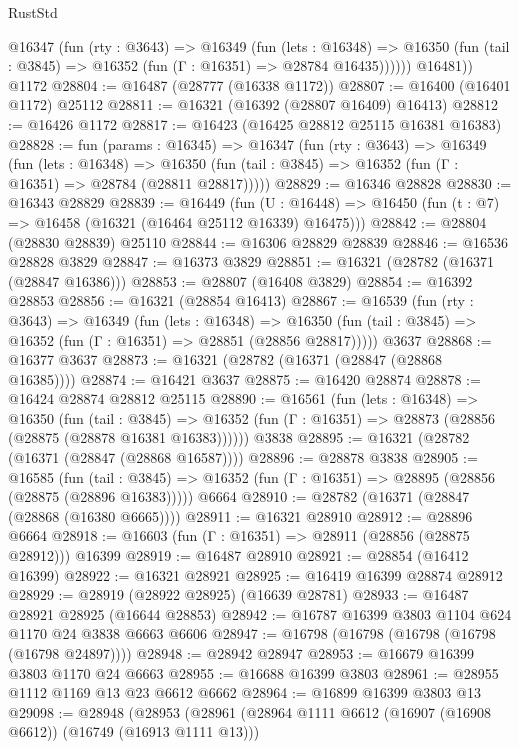 \begin{lexlean}{RustStd}
\begin{coremodule}
          @16347
            (fun (rty : @3643) =>
            @16349
              (fun (lets : @16348) =>
              @16350 (fun (tail : @3845) => @16352 (fun (Γ : @16351) => @28784 @16435))))))
        @16481))
    @1172
@28804 := @16487 (@28777 (@16338 @1172))
@28807 := @16400 (@16401 @1172) @25112
@28811 := @16321 (@16392 (@28807 @16409) @16413)
@28812 := @16426 @1172
@28817 := @16423 (@16425 @28812 @25115 @16381 @16383)
@28828 := fun (params : @16345) =>
  @16347
    (fun (rty : @3643) =>
    @16349
      (fun (lets : @16348) =>
      @16350 (fun (tail : @3845) => @16352 (fun (Γ : @16351) => @28784 (@28811 @28817)))))
@28829 := @16346 @28828
@28830 := @16343 @28829
@28839 := @16449
    (fun (U : @16448) => @16450 (fun (t : @7) => @16458 (@16321 (@16464 @25112 @16339) @16475)))
@28842 := @28804 (@28830 @28839) @25110
@28844 := @16306 @28829 @28839
@28846 := @16536 @28828 @3829
@28847 := @16373 @3829
@28851 := @16321 (@28782 (@16371 (@28847 @16386)))
@28853 := @28807 (@16408 @3829)
@28854 := @16392 @28853
@28856 := @16321 (@28854 @16413)
@28867 := @16539
    (fun (rty : @3643) =>
    @16349
      (fun (lets : @16348) =>
      @16350 (fun (tail : @3845) => @16352 (fun (Γ : @16351) => @28851 (@28856 @28817)))))
    @3637
@28868 := @16377 @3637
@28873 := @16321 (@28782 (@16371 (@28847 (@28868 @16385))))
@28874 := @16421 @3637
@28875 := @16420 @28874
@28878 := @16424 @28874 @28812 @25115
@28890 := @16561
    (fun (lets : @16348) =>
    @16350
      (fun (tail : @3845) =>
      @16352 (fun (Γ : @16351) => @28873 (@28856 (@28875 (@28878 @16381 @16383))))))
    @3838
@28895 := @16321 (@28782 (@16371 (@28847 (@28868 @16587))))
@28896 := @28878 @3838
@28905 := @16585
    (fun (tail : @3845) => @16352 (fun (Γ : @16351) => @28895 (@28856 (@28875 (@28896 @16383)))))
    @6664
@28910 := @28782 (@16371 (@28847 (@28868 (@16380 @6665))))
@28911 := @16321 @28910
@28912 := @28896 @6664
@28918 := @16603 (fun (Γ : @16351) => @28911 (@28856 (@28875 @28912))) @16399
@28919 := @16487 @28910
@28921 := @28854 (@16412 @16399)
@28922 := @16321 @28921
@28925 := @16419 @16399 @28874 @28912
@28929 := @28919 (@28922 @28925) (@16639 @28781)
@28933 := @16487 @28921 @28925 (@16644 @28853)
@28942 := @16787 @16399 @3803 @1104 @624 @1170 @24 @3838 @6663 @6606
@28947 := @16798 (@16798 (@16798 (@16798 (@16798 @24897))))
@28948 := @28942 @28947
@28953 := @16679 @16399 @3803 @1170 @24 @6663
@28955 := @16688 @16399 @3803
@28961 := @28955 @1112 @1169 @13 @23 @6612 @6662
@28964 := @16899 @16399 @3803 @13
@29098 := @28948
    (@28953
      (@28961
        (@28964 @1111 @6612 (@16907 (@16908 @6612)) (@16749 (@16913 @1111 @13)))

\end{coremodule}
\end{lexlean}

